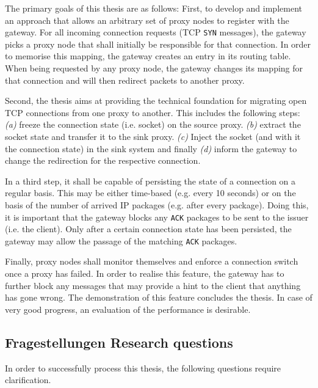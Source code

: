 \documentclass[10pt,a4paper,oneside]{scrartcl}
\begin{document}
The primary goals of this thesis are as follows: First, to develop and implement an approach that 
allows an arbitrary set of proxy nodes to register with the gateway. For all incoming connection
requests (TCP \texttt{SYN} messages), the gateway picks a proxy node that shall initially be 
responsible for that connection. In order to memorise this mapping, the gateway creates an entry 
in its routing table. When being requested by any proxy node, the gateway changes its mapping for
that connection and will then redirect packets to another proxy.

Second, the thesis aims at providing the technical foundation for migrating open TCP connections 
from one proxy to another. This includes the following steps: \emph{(a)} freeze the connection 
state (i.e. socket) on the source proxy. \emph{(b)} extract the socket state and transfer it to 
the sink proxy. \emph{(c)} Inject the socket (and with it the connection state) in the sink system
and finally \emph{(d)} inform the gateway to change the redirection for the respective connection.

In a third step, it shall be capable of persisting the state of a connection on a regular basis. 
This may be either time-based (e.g. every 10 seconds) or on the basis of the number of arrived IP
packages (e.g. after every package). Doing this, it is important that the gateway blocks any 
\texttt{ACK} packages to be sent to the issuer (i.e. the client). Only after a certain connection 
state has been persisted, the gateway may allow the passage of the matching \texttt{ACK} packages. 

Finally, proxy nodes shall monitor themselves and enforce a connection switch once a proxy has
failed. In order to realise this feature, the gateway has to further block any messages that may
provide a hint to the client that anything has gone wrong. The demonstration of this feature
concludes the thesis. In case of very good progress, an evaluation of the performance is desirable.


\subsection{
	{Fragestellungen}
	{Research questions}}
\label{sub:questions}

In order to successfully process this thesis, the following questions require clarification. 
\end{document}
